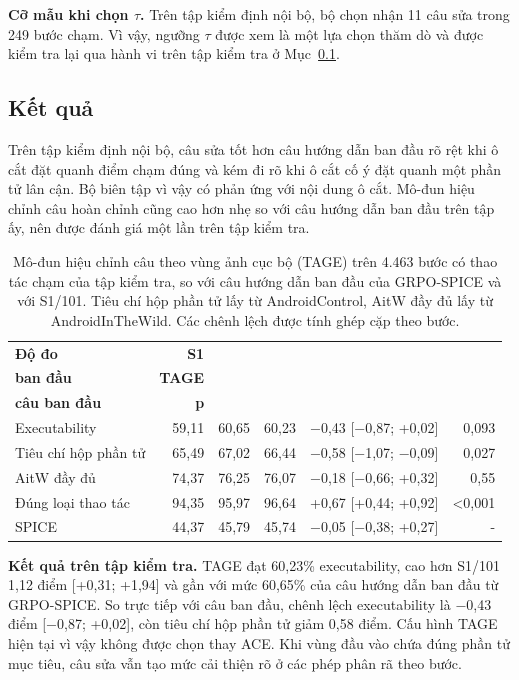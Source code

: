 \textbf{Cỡ mẫu khi chọn $\tau$.} Trên tập kiểm định nội bộ, bộ chọn nhận 11 câu sửa trong 249 bước chạm. Vì vậy, ngưỡng $\tau$ được xem là một lựa chọn thăm dò và được kiểm tra lại qua hành vi trên tập kiểm tra ở Mục~\ref{sec:A.7.2}.

\subsection{Kết quả}\label{sec:A.7.2}

Trên tập kiểm định nội bộ, câu sửa tốt hơn câu hướng dẫn ban đầu rõ rệt khi ô cắt đặt quanh điểm chạm đúng và kém đi rõ khi ô cắt cố ý đặt quanh một phần tử lân cận. Bộ biên tập vì vậy có phản ứng với nội dung ô cắt. Mô-đun hiệu chỉnh câu hoàn chỉnh cũng cao hơn nhẹ so với câu hướng dẫn ban đầu trên tập ấy, nên được đánh giá một lần trên tập kiểm tra.

\begin{table}[htbp]
\centering\small
\caption[Mô-đun hiệu chỉnh câu theo vùng ảnh cục bộ (TAGE) trên 4.463 bước chạm của tập kiểm tra, so với câu hướng dẫn ban đầu của mô hình học tăng cường với phần thưởng SPICE và với S1.]{Mô-đun hiệu chỉnh câu theo vùng ảnh cục bộ (TAGE) trên 4.463 bước có thao tác chạm của tập kiểm tra, so với câu hướng dẫn ban đầu của GRPO-SPICE và với S1/101. Tiêu chí hộp phần tử lấy từ AndroidControl, AitW đầy đủ lấy từ AndroidInTheWild. Các chênh lệch được tính ghép cặp theo bước.}\label{tab:A.15}
\begin{tabular}{@{}lrrrrr@{}}
\toprule
\textbf{Độ đo} & \textbf{S1} & \shortstack{\textbf{Câu}\\\textbf{ban đầu}} & \textbf{TAGE} & \shortstack{\textbf{TAGE $-$}\\\textbf{câu ban đầu}} & \textbf{p} \\
\midrule
Executability & 59,11 & 60,65 & 60,23 & $-$0,43 [$-$0,87; +0,02] & 0,093 \\
Tiêu chí hộp phần tử & 65,49 & 67,02 & 66,44 & $-$0,58 [$-$1,07; $-$0,09] & 0,027 \\
AitW đầy đủ & 74,37 & 76,25 & 76,07 & $-$0,18 [$-$0,66; +0,32] & 0,55 \\
Đúng loại thao tác & 94,35 & 95,97 & 96,64 & +0,67 [+0,44; +0,92] & <0,001 \\
SPICE & 44,37 & 45,79 & 45,74 & $-$0,05 [$-$0,38; +0,27] & - \\
\bottomrule
\end{tabular}
\end{table}

\textbf{Kết quả trên tập kiểm tra.} TAGE đạt 60,23\% executability, cao hơn S1/101 1,12 điểm [+0,31; +1,94] và gần với mức 60,65\% của câu hướng dẫn ban đầu từ GRPO-SPICE. So trực tiếp với câu ban đầu, chênh lệch executability là $-$0,43 điểm [$-$0,87; +0,02], còn tiêu chí hộp phần tử giảm 0,58 điểm. Cấu hình TAGE hiện tại vì vậy không được chọn thay ACE. Khi vùng đầu vào chứa đúng phần tử mục tiêu, câu sửa vẫn tạo mức cải thiện rõ ở các phép phân rã theo bước.

